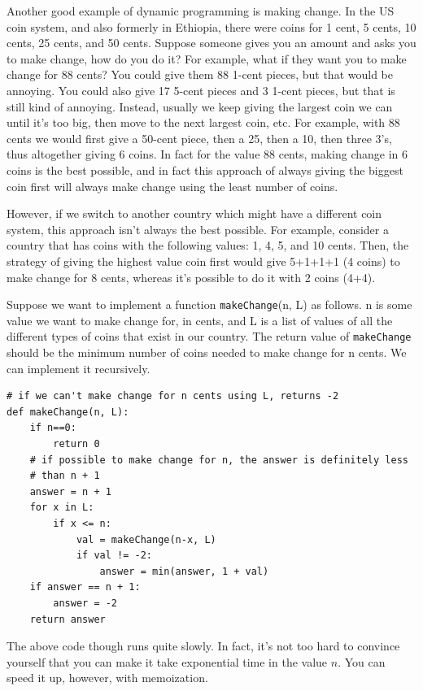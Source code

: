 \documentclass[11pt]{article}
\begin{document}
Another good example of dynamic programming is making change.  In the
US coin system, and also formerly in Ethiopia, there were coins for 1
cent, 5 cents, 10 cents, 25 cents, and 50 cents.  Suppose someone
gives you an amount and asks you to make change, how do you do it?
For example, what if they want you to make change for 88 cents?
You could give them 88 1-cent pieces, but that would be annoying.  You
could also give 17 5-cent pieces and 3 1-cent pieces, but that is
still kind of annoying.
Instead, usually we keep giving the largest coin we can until it's too
big,
then move to the next largest coin, etc.  For example, with 88 cents
we would first give a 50-cent piece, then a 25, then a 10, then three
3's, thus altogether giving 6 coins.  In fact for the value 88 cents,
making change in 6 coins is the best possible, and in fact this
approach of always giving the biggest coin first will always make
change using the least number of coins.

However, if we switch to another country which might have a different
coin system, this approach isn't always the best possible.  For
example, consider a country that has coins with the following
values: 1, 4, 5, and 10 cents.  Then, the strategy of giving the
highest value coin first would give 5+1+1+1 (4 coins) to make change
for 8 cents, whereas it's possible to do it with 2 coins (4+4).

Suppose we want to implement a function \texttt{makeChange}(n, L) as
follows.  n is some value we want to make change for, in cents, and L
is a list of values of all the different types of coins that exist in
our country.  The return value of \texttt{makeChange} should be the
minimum number of coins needed to make change for n cents.  We can
implement it recursively.

\begin{verbatim}
# if we can't make change for n cents using L, returns -2
def makeChange(n, L):
    if n==0:
        return 0
    # if possible to make change for n, the answer is definitely less
    # than n + 1
    answer = n + 1
    for x in L:
        if x <= n:
            val = makeChange(n-x, L)
            if val != -2:
                answer = min(answer, 1 + val)
    if answer == n + 1:
        answer = -2
    return answer
\end{verbatim}

The above code though runs quite slowly.  In fact, it's not too hard
to convince yourself that you can make it take exponential time in the
value $n$.  You
can speed it up, however, with memoization.
\end{document}
